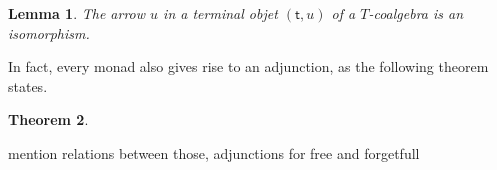 \documentclass{article}
\newcommand{\ob}[1]{\mathsf{#1}} %
\newtheorem{theorem}{Theorem}
\newtheorem{lemma}[theorem]{Lemma}
\begin{document}
\begin{lemma}
	The arrow $u$ in a terminal objet $(\ob{t}, u)$ of a $T$-coalgebra is an isomorphism.
\end{lemma}

In fact, every monad also gives rise to an adjunction, as the following theorem states.

\begin{theorem}

\end{theorem}





mention relations between those, adjunctions for free and forgetfull 

\end{document}
